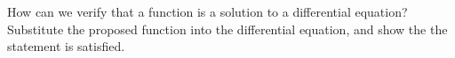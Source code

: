 {
How can we verify that a function is a solution to a differential equation?
}
{
Substitute the proposed function into the differential equation, and show the the statement is satisfied.
}